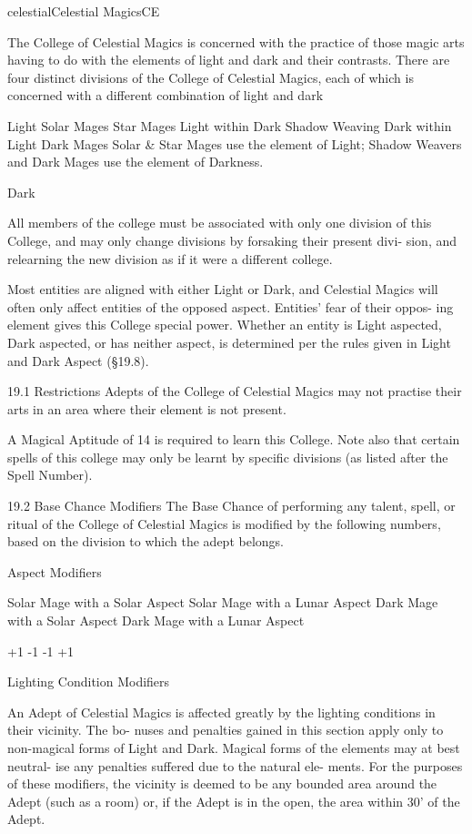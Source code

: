 \begin{College}[1.3]{celestial}{Celestial Magics}{CE}

The College of Celestial Magics is concerned with the practice of
those magic arts having to do with the elements of light and dark and
their contrasts.  There are four distinct divisions of the College of
Celestial Magics, each of which is concerned with a different
combination of light and dark

Light 
Solar Mages 
Star Mages 
Light within Dark  
Shadow Weaving  Dark within Light  
Dark Mages 
Solar  \&  Star  Mages  use  the  element  of  Light; 
Shadow Weavers and Dark Mages use the element 
of Darkness. 

Dark 

All members of the college must be associated with 
only  one  division  of  this  College,  and  may  only 
change  divisions  by  forsaking  their  present  divi-
sion, and relearning the new division as if it were a 
different college. 

Most entities are aligned with either Light or Dark, 
and Celestial Magics will often only affect entities 
of the opposed aspect. Entities’ fear of their oppos-
ing  element  gives  this  College  special  power. 
Whether an entity is Light aspected, Dark aspected, 
or  has  neither  aspect,  is  determined  per  the  rules 
given in Light and Dark Aspect (§19.8). 

19.1 Restrictions 
Adepts of the College of Celestial Magics may not 
practise their arts in an area where their element is 
not present. 

A  Magical  Aptitude  of  14 is  required  to  learn  this 
College. Note also that certain spells of this college 
may  only  be  learnt  by  specific  divisions  (as  listed 
after the Spell Number). 

19.2 Base Chance Modifiers 
The  Base  Chance  of  performing  any  talent,  spell, 
or  ritual  of  the  College  of  Celestial  Magics  is 
modified  by  the  following  numbers,  based  on  the 
division to which the adept belongs. 

Aspect Modifiers 

Solar Mage with a Solar Aspect 
Solar Mage with a Lunar Aspect 
Dark Mage with a Solar Aspect 
Dark Mage with a Lunar Aspect 

+1%
-1%
-1%
+1%

Lighting Condition Modifiers 

An Adept of Celestial Magics is affected greatly by 
the  lighting  conditions  in  their  vicinity.  The  bo-
nuses  and  penalties  gained  in  this  section  apply 
only  to  non-magical  forms  of  Light  and  Dark. 
Magical forms of the elements may at best neutral-
ise  any  penalties  suffered  due  to  the  natural  ele-
ments.  For  the  purposes  of  these  modifiers,  the 
vicinity  is  deemed  to  be  any  bounded  area  around 
the Adept (such as a room) or, if the Adept is in the 
open, the area within 30’ of the Adept. 


\end{College}
